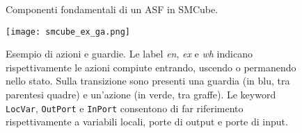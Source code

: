 
\begin{figure}
\caption{Componenti fondamentali di un ASF in SMCube.}
\label{Fig:smcube_blocks}
\end{figure}

\begin{figure}
\centering
\texttt{[image: smcube\_ex\_ga.png]}
\caption{Esempio di azioni e guardie. Le label \textit{en}, \textit{ex} e \textit{wh} indicano rispettivamente le azioni compiute entrando, uscendo o permanendo nello stato. Sulla transizione sono presenti una guardia (in blu, tra parentesi quadre) e un'azione (in verde, tra graffe). Le keyword \texttt{LocVar}, \texttt{OutPort} e \texttt{InPort} consentono di far riferimento rispettivamente a variabili locali, porte di output e porte di input.}
\label{Fig:smcube_ex_ga}
\end{figure}


